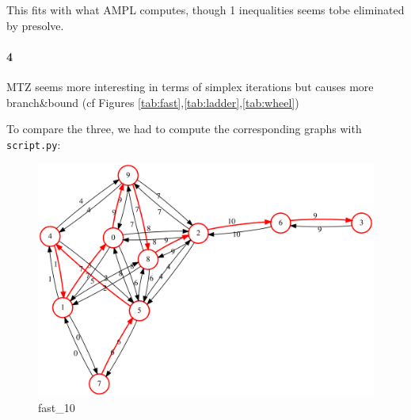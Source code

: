 \documentclass{article}
\begin{document}
This fits with what AMPL computes, though 1 inequalities seems tobe eliminated by presolve.

\paragraph{4}
MTZ seems more interesting in terms of simplex iterations but causes more
branch\&bound (cf Figures \ref{tab:fast},\ref{tab:ladder},\ref{tab:wheel})

To compare the three, we had to compute the corresponding graphs with \texttt{script.py}:

\begin{figure}[H]
  \centering
  \includegraphics[scale=0.3]{graph/GST_fast_10}
  \caption{fast\_10}
\end{figure}
\end{document}

